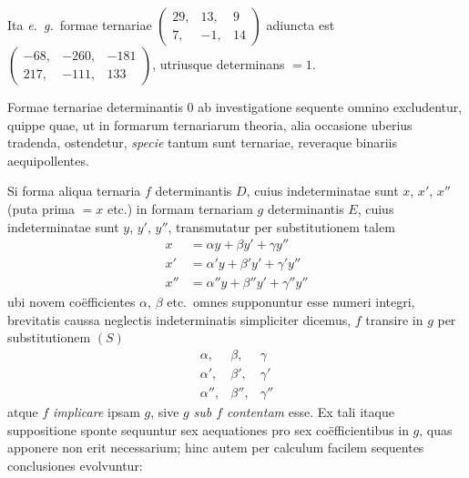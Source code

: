 Ita \textit{e.\ g.}\ formae ternariae $\left(\begin{smallmatrix}29,\allowbreak &13,\allowbreak &9\\7,\allowbreak &-1,\allowbreak &14\end{smallmatrix}\right)$
adiuncta est $\left(\begin{smallmatrix}-68,\allowbreak &-260,\allowbreak &-181\\217,\allowbreak &-111,\allowbreak &133\end{smallmatrix}\right)$,
utriusque determinans $=1$.

Formae ternariae determinantis $0$ ab investigatione sequente omnino excludentur,
quippe quae, ut in formarum ternariarum theoria, alia occasione uberius
tradenda, ostendetur, \textit{specie} tantum sunt ternariae, reveraque binariis aequipollentes.

Si forma aliqua ternaria $f$ determinantis $D$, cuius indeterminatae sunt
$x$, $x'$, $x''$ (puta prima $=x$ etc.) in formam ternariam $g$ determinantis $E$, cuius
indeterminatae sunt $y$, $y'$, $y''$, transmutatur per substitutionem talem
\[
\begin{aligned}
x&=\alpha y+\beta y'+\gamma y'' \\
x'&=\alpha'y+\beta'y'+\gamma'y'' \\
x''&=\alpha''y+\beta''y'+\gamma''y''
\end{aligned}
\]
ubi novem co\"efficientes $\alpha$, $\beta$ etc.\ omnes supponuntur esse numeri integri, brevitatis
caussa neglectis indeterminatis simpliciter dicemus, $f$ transire in $g$ per substitutionem
$(S)$
\[
\begin{array}{ccc}
\alpha, & \beta, & \gamma \\
\alpha', & \beta', & \gamma' \\
\alpha'', & \beta'', & \gamma''
\end{array}
\]
atque $f$ \textit{implicare} ipsam $g$, sive $g$ \textit{sub $f$ contentam} esse. Ex tali itaque suppositione
sponte sequuntur sex aequationes pro sex co\"efficientibus in $g$, quas apponere
non erit necessarium; hinc autem per calculum facilem sequentes conclusiones
evolvuntur:

